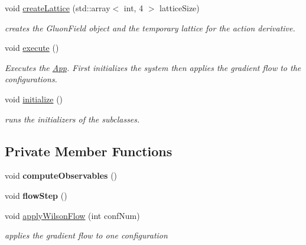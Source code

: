 \begin{DoxyCompactItemize}
\item 
void \hyperlink{classWilsonFlow_a1ae84f31a7b54b423bbe1d76001468d1}{create\+Lattice} (std\+::array$<$ int, 4 $>$ lattice\+Size)\hypertarget{classWilsonFlow_a1ae84f31a7b54b423bbe1d76001468d1}{}\label{classWilsonFlow_a1ae84f31a7b54b423bbe1d76001468d1}

\begin{DoxyCompactList}\small\item\em creates the Gluon\+Field object and the temporary lattice for the action derivative. \end{DoxyCompactList}\item 
void \hyperlink{classWilsonFlow_a300944faffcb90c69ba9e2b62fd31561}{execute} ()\hypertarget{classWilsonFlow_a300944faffcb90c69ba9e2b62fd31561}{}\label{classWilsonFlow_a300944faffcb90c69ba9e2b62fd31561}

\begin{DoxyCompactList}\small\item\em Executes the \hyperlink{classApp}{App}. First initializes the system then applies the gradient flow to the configurations. \end{DoxyCompactList}\item 
void \hyperlink{classWilsonFlow_afc84f29eab27e12f9ff51417dd6cf984}{initialize} ()\hypertarget{classWilsonFlow_afc84f29eab27e12f9ff51417dd6cf984}{}\label{classWilsonFlow_afc84f29eab27e12f9ff51417dd6cf984}

\begin{DoxyCompactList}\small\item\em runs the initializers of the subclasses. \end{DoxyCompactList}\end{DoxyCompactItemize}
\subsection*{Private Member Functions}
\begin{DoxyCompactItemize}
\item 
void {\bfseries compute\+Observables} ()\hypertarget{classWilsonFlow_aa9e371b2e2b8b1a24b372030dea6859b}{}\label{classWilsonFlow_aa9e371b2e2b8b1a24b372030dea6859b}

\item 
void {\bfseries flow\+Step} ()\hypertarget{classWilsonFlow_aee1b088e9560a35e72a79d2cafc433c6}{}\label{classWilsonFlow_aee1b088e9560a35e72a79d2cafc433c6}

\item 
void \hyperlink{classWilsonFlow_ae24fd21ddd2c6703b1cb02245dd20138}{apply\+Wilson\+Flow} (int conf\+Num)
\begin{DoxyCompactList}\small\item\em applies the gradient flow to one configuration \end{DoxyCompactList}\end{DoxyCompactItemize}
